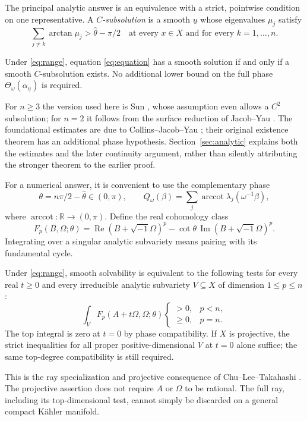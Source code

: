 \documentclass[12pt,reqno]{amsart}
\newcommand{\ii}{\sqrt{-1}}
\newcommand{\R}{\mathbb R}
\newcommand{\Th}{\Theta_\omega}
\newcommand{\hth}{\widehat\theta}
\newcommand{\arccot}{\operatorname{arccot}}
\newcommand{\Ree}{\operatorname{Re}}
\newcommand{\Imm}{\operatorname{Im}}
\begin{document}
The principal analytic answer is an equivalence with a strict, pointwise condition on one representative. A \emph{$C$-subsolution} is a smooth $\underline u$ whose eigenvalues $\mu_j$ satisfy
\begin{equation}\label{eq:subsolution}
 \sum_{j\ne k}\arctan\mu_j>\hth-\pi/2
 \quad\text{at every }x\in X\text{ and for every }k=1,\ldots,n.
\end{equation}
\begin{theorem}\label{thm:analytic}
Under \eqref{eq:range}, equation \eqref{eq:equation} has a smooth solution if and only if a smooth $C$-subsolution exists. No additional lower bound on the full phase $\Th(\alpha_{\underline u})$ is required.
\end{theorem}
For $n\geq3$ the version used here is Sun \cite[Proposition 4.1]{Sun}, whose assumption even allows a $C^2$ subsolution; for $n=2$ it follows from the surface reduction of Jacob--Yau \cite[Theorem 1.2]{JY}. The foundational estimates are due to Collins--Jacob--Yau \cite{CJY}; their original existence theorem has an additional phase hypothesis. Section~\ref{sec:analytic} explains both the estimates and the later continuity argument, rather than silently attributing the stronger theorem to the earlier proof.

For a numerical answer, it is convenient to use the complementary phase
\begin{equation}\label{eq:Q}
 \theta=n\pi/2-\hth\in(0,\pi),\qquad
 Q_\omega(\beta)=\sum_j\arccot\lambda_j(\omega^{-1}\beta),
\end{equation}
where $\arccot\colon\R\to(0,\pi)$. Define the real cohomology class
\begin{equation}\label{eq:F}
 F_p(B,\Omega;\theta)=\Ree(B+\ii\Omega)^p
                  -\cot\theta\,\Imm(B+\ii\Omega)^p.
\end{equation}
Integrating over a singular analytic subvariety means pairing with its fundamental cycle.
\begin{theorem}\label{thm:numerical}
Under \eqref{eq:range}, smooth solvability is equivalent to the following tests for every real $t\geq0$ and every irreducible analytic subvariety $V\subseteq X$ of dimension $1\leq p\leq n$:
\begin{equation}
 \int_V F_p(A+t\Omega,\Omega;\theta)
 \begin{cases}>0,&p<n,\\ \geq0,&p=n.\end{cases}
\end{equation}
The top integral is zero at $t=0$ by phase compatibility. If $X$ is projective, the strict inequalities for all proper positive-dimensional $V$ at $t=0$ alone suffice; the same top-degree compatibility is still required.
\end{theorem}
This is the ray specialization and projective consequence of Chu--Lee--Takahashi \cite[Theorem 1.3 and Corollaries 1.4--1.5]{CLT}. The projective assertion does not require $A$ or $\Omega$ to be rational. The full ray, including its top-dimensional test, cannot simply be discarded on a general compact K\"ahler manifold.
\end{document}
